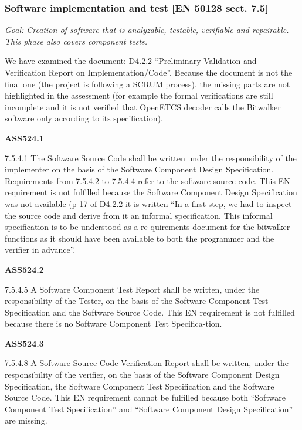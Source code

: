 \subsubsection{Software implementation and test [EN 50128 sect. 7.5]}
\textit{Goal: Creation of software that is analyzable, testable, verifiable and repairable. This phase also covers component tests.}

\bigskip
{}
We have examined the document: D4.2.2 “Preliminary Validation and Verification Report on
Implementation/Code”.
Because the document is not the final one (the project is following a SCRUM process), the missing parts are not highlighted in the assessment (for example the formal verifications are still incomplete and it is not verified that OpenETCS decoder calls the Bitwalker software only according to its specification).

{\bfseries ASS524.1}

7.5.4.1 The Software Source Code shall be written under the responsibility of the implementer on the basis of the Software Component Design Specification. Requirements from 7.5.4.2 to 7.5.4.4 refer to the software source code.
This EN requirement is not fulfilled because the Software Component Design Specification was not available (p 17 of D4.2.2 it is written “In a first step, we had to inspect the source code and derive from it an informal specification. This informal specification is to be understood as a re-quirements document for the bitwalker functions as it should have been available to both the programmer and the verifier in advance”.

{\bfseries ASS524.2}

7.5.4.5 A Software Component Test Report shall be written, under the responsibility of the Tester, on the basis of the Software Component Test Specification and the Software Source Code.
This EN requirement is not fulfilled because there is no Software Component Test Specifica-tion.

{\bfseries ASS524.3}

7.5.4.8 A Software Source Code Verification Report shall be written, under the responsibility of the verifier, on the basis of the Software Component Design Specification, the Software Component Test Specification and the Software Source Code.
This EN requirement cannot be fulfilled because both “Software Component Test Specification” and “Software Component Design Specification” are missing.

